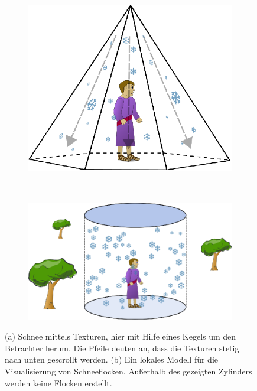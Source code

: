 \begin{figure}[h]
	\begin{subfigure}[t]{0.4\textwidth}
		\centering
		\includegraphics[width=\textwidth]{images/snow_double_cone}
                \caption{}
		\label{fig:introduction_snow_double_cone}
	\end{subfigure}
	~
	\begin{subfigure}[t]{0.6\textwidth}
		\centering
		\includegraphics[width=\textwidth]{images/particle_cylinder}
                \caption{}
		\label{fig:introduction_particle_cylinder}
	\end{subfigure}
	\caption{(a) Schnee mittels Texturen, hier mit Hilfe eines Kegels um den Betrachter herum. Die Pfeile deuten an, dass die Texturen stetig nach unten gescrollt werden. (b) Ein lokales Modell für die Visualisierung von Schneeflocken. Außerhalb des gezeigten Zylinders werden keine Flocken erstellt.}
\end{figure}

